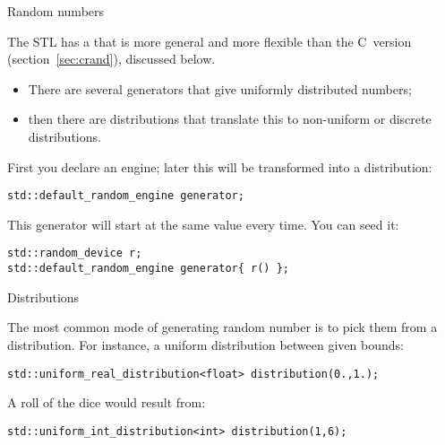 
 {Random numbers}
\label{sec:stl:random}

The \ac{STL} has a
that is more general and more flexible than the C~version (section~\ref{sec:crand}),
discussed below.

\begin{itemize}
\item There are several generators that give uniformly distributed
  numbers;
\item then there are distributions that translate this to non-uniform
  or discrete distributions.
\end{itemize}

First you declare an engine; later this will be transformed into a distribution:
\begin{lstlisting}
std::default_random_engine generator;
\end{lstlisting}

This generator will start at the same value every time.
You can seed it:
\begin{lstlisting}
std::random_device r;
std::default_random_engine generator{ r() };
\end{lstlisting}

 {Distributions}

The most common mode of generating random number
is to pick them from a distribution.
For instance, a uniform distribution between given bounds:
\begin{lstlisting}
std::uniform_real_distribution<float> distribution(0.,1.);
\end{lstlisting}
A roll of the dice would result from:
\begin{lstlisting}
std::uniform_int_distribution<int> distribution(1,6);
\end{lstlisting}

